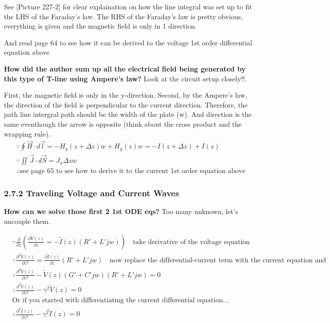 \documentclass[11pt]{article}
\begin{document}
See {[}Picture 227-2{]} for clear explaination on how the line integral
was set up to fit the LHS of the Faraday's law. The RHS of the Faraday's
law is pretty obvious, everything is given and the magnetic field is
only in 1 direction.

And read page 64 to see how it can be derived to the voltage 1st order
differential equation above

    \textbf{How did the author sum up all the electrical field being
generated by this type of T-line using Ampere's law?} Look at the
circuit setup closely!!.

    First, the magnetic field is only in the y-direction. Second, by the
Ampere's law, the direction of the field is perpendicular to the current
direction. Therefore, the path line intergral path should be the width
of the plate (w). And direction is the same eventhough the arrow is
opposite (think about the cross product and the wrapping rule). \[
\begin{align}
&\because \oint{\vec{H}\cdot d\vec{l}}=-H_y(z+\Delta z)w+H_y(z)w=-I(z+\Delta z)+I(z)\\
&\because \iint{\vec{J}\cdot d\vec{S}}=J_x\Delta zw \\
&\therefore \text{see page 65 to see how to derive it to the current 1st order equation above}
\end{align}
\]

    \hypertarget{traveling-voltage-and-current-waves}{%
\subsubsection{2.7.2 Traveling Voltage and Current
Waves}\label{traveling-voltage-and-current-waves}}

\textbf{How can we solve those first 2 1st ODE eqs?} Too many unknown,
let's uncouple them.

    \[
\begin{align}
    &\because \frac{\partial}{\partial z}(\frac{\partial \tilde{V}(z)}{\partial z} = -\tilde{I}(z)(R'+L'jw)) \quad \text{take derivative of the voltage equation} \\
    &\because \frac{\partial^2 \tilde{V}(z)}{\partial z^2} = \frac{\partial \tilde{I}(z)}{\partial z}(R'+L'jw) \quad \text{now replace the differential-current term with the current equation and simplify}\\
    &\because \frac{\partial^2 \tilde{V}(z)}{\partial z^2} - \tilde{V}(z)(G'+C'jw)(R'+L'jw) = 0 \\
    &\therefore \frac{\partial^2 \tilde{V}(z)}{\partial z^2} - \gamma^2\tilde{V}(z) = 0 \\
    &\text{Or if you started with differentiating the current differential equation...} \\
    &\therefore \frac{\partial^2 \tilde{I}(z)}{\partial z^2} - \gamma^2\tilde{I}(z) = 0
\end{align}
\]
\end{document}
